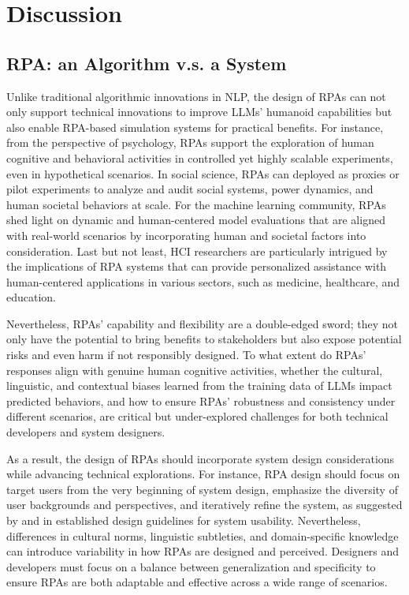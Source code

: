 

\section{Discussion}
\label{sec:discussion}


\subsection{RPA: an Algorithm v.s. a System}

Unlike traditional algorithmic innovations in NLP, the design of RPAs can not only support technical innovations to improve LLMs' humanoid capabilities but also enable RPA-based simulation systems for practical benefits.
For instance, from the perspective of psychology, RPAs support the exploration of human cognitive and behavioral activities in controlled yet highly scalable experiments, even in hypothetical scenarios.
In social science, RPAs can deployed as proxies or pilot experiments to analyze and audit social systems, power dynamics, and human societal behaviors at scale.
For the machine learning community, RPAs shed light on dynamic and human-centered model evaluations that are aligned with real-world scenarios by incorporating human and societal factors into consideration.
Last but not least, HCI researchers are particularly intrigued by the implications of RPA systems that can provide personalized assistance with human-centered applications in various sectors, such as medicine, healthcare, and education. 

Nevertheless, RPAs' capability and flexibility are a double-edged sword; they not only have the potential to bring benefits to stakeholders but also expose potential risks and even harm if not responsibly designed.
To what extent do RPAs' responses align with genuine human cognitive activities, whether the cultural, linguistic, and contextual biases learned from the training data of LLMs impact predicted behaviors, and how to ensure RPAs' robustness and consistency under different scenarios, are critical but under-explored challenges for both technical developers and system designers.


As a result, the design of RPAs should incorporate system design considerations while advancing technical explorations.
For instance, RPA design should focus on target users from the very beginning of system design, emphasize the diversity of user backgrounds and perspectives, and iteratively refine the system, as suggested by \citet{gould1985designing} and \citet{shneiderman2010designing} in established design guidelines for system usability.
Nevertheless, differences in cultural norms, linguistic subtleties, and domain-specific knowledge can introduce variability in how RPAs are designed and perceived.
Designers and developers must focus on a balance between generalization and specificity to ensure RPAs are both adaptable and effective across a wide range of scenarios. 



